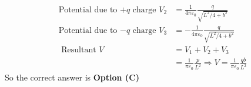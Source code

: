 \begin{enumerate}
\begin{answer}
\begin{align*}
		\text{Potential due to $+q$ charge }V_{2}&=\frac{1}{4 \pi \varepsilon_{0}} \frac{q}{\sqrt{L^{2} / 4+b^{2}}}\\
		\text{Potential due to $-q$ charge }V_{3}&=-\frac{1}{4 \pi \varepsilon_{0}} \frac{q}{\sqrt{L^{2} / 4+b^{2}}}\\
		\text{	Resultant }V&=V_{1}+V_{2}+V_{3}\\&=\frac{1}{\pi \varepsilon_{0}} \frac{p}{L^{2}} \Rightarrow V=\frac{1}{\pi \varepsilon_{0}} \frac{q b}{L^{2}}
		\end{align*}
		So the correct answer is \textbf{Option (C)}
	\end{answer}
	
	
	
\end{enumerate}